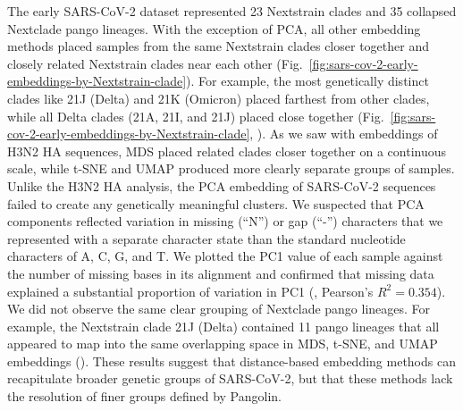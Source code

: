 \documentclass[10pt,letterpaper]{article}
\begin{document}
The early SARS-CoV-2 dataset represented 23 Nextstrain clades and 35 collapsed Nextclade pango lineages.
With the exception of PCA, all other embedding methods placed samples from the same Nextstrain clades closer together and closely related Nextstrain clades near each other (Fig.~\ref{fig:sars-cov-2-early-embeddings-by-Nextstrain-clade}).
For example, the most genetically distinct clades like 21J (Delta) and 21K (Omicron) placed farthest from other clades, while all Delta clades (21A, 21I, and 21J) placed close together (Fig.~\ref{fig:sars-cov-2-early-embeddings-by-Nextstrain-clade}, ).
As we saw with embeddings of H3N2 HA sequences, MDS placed related clades closer together on a continuous scale, while t-SNE and UMAP produced more clearly separate groups of samples.
Unlike the H3N2 HA analysis, the PCA embedding of SARS-CoV-2 sequences failed to create any genetically meaningful clusters.
We suspected that PCA components reflected variation in missing (``N'') or gap (``-'') characters that we represented with a separate character state than the standard nucleotide characters of A, C, G, and T.
We plotted the PC1 value of each sample against the number of missing bases in its alignment and confirmed that missing data explained a substantial proportion of variation in PC1 (, Pearson's $R^{2}=0.354$).
We did not observe the same clear grouping of Nextclade pango lineages.
For example, the Nextstrain clade 21J (Delta) contained 11 pango lineages that all appeared to map into the same overlapping space in MDS, t-SNE, and UMAP embeddings ().
These results suggest that distance-based embedding methods can recapitulate broader genetic groups of SARS-CoV-2, but that these methods lack the resolution of finer groups defined by Pangolin.
\end{document}
